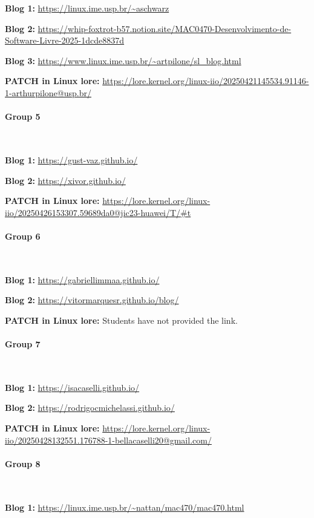 \textbf{Blog 1:} \url{https://linux.ime.usp.br/~aschwarz}

\textbf{Blog 2:} \url{https://whip-foxtrot-b57.notion.site/MAC0470-Desenvolvimento-de-Software-Livre-2025-1dcde8837d}

\textbf{Blog 3:} \url{https://www.linux.ime.usp.br/~artpilone/sl_blog.html}

\textbf{PATCH in Linux lore:} \url{https://lore.kernel.org/linux-iio/20250421145534.91146-1-arthurpilone@usp.br/}

\paragraph{Group 5}

\

\textbf{Blog 1:} \url{https://gust-vaz.github.io/}

\textbf{Blog 2:} \url{https://xivor.github.io/}

\textbf{PATCH in Linux lore:} \url{https://lore.kernel.org/linux-iio/20250426153307.59689da0@jic23-huawei/T/#t}

\paragraph{Group 6}

\

\textbf{Blog 1:} \url{https://gabriellimmaa.github.io/}

\textbf{Blog 2:} \url{https://vitormarquesr.github.io/blog/}

\textbf{PATCH in Linux lore:} Students have not provided the link.

\paragraph{Group 7}

\

\textbf{Blog 1:} \url{https://isacaselli.github.io/}

\textbf{Blog 2:} \url{https://rodrigocmichelassi.github.io/}

\textbf{PATCH in Linux lore:} \url{https://lore.kernel.org/linux-iio/20250428132551.176788-1-bellacaselli20@gmail.com/}

\paragraph{Group 8}

\

\textbf{Blog 1:} \url{https://linux.ime.usp.br/~nattan/mac470/mac470.html}

